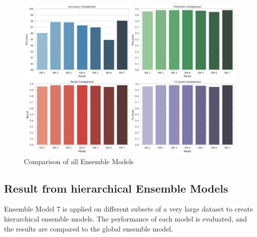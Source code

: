 \begin{figure}[h!]  
    \centering
    \includegraphics[width=1.0\textwidth]{Images/EM COMPARE.png}  
    \caption{Comparison of all Ensemble Models}
    \label{lstm arch}  %
\end{figure}



\subsection{Result from hierarchical Ensemble Models}

\noindent
Ensemble Model 7 is applied on different subsets of a very large dataset to create hierarchical ensemble models. The performance of each model is evaluated, and the results are compared to the global ensemble model. 

